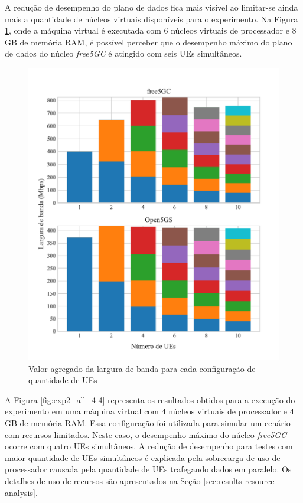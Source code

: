 A redução de desempenho do plano de dados fica mais visível ao limitar-se ainda mais a quantidade de núcleos virtuais disponíveis para o experimento.
Na Figura \ref{fig:exp2_all_6-8}, onde a máquina virtual é executada com 6 núcleos virtuais de processador e 8 GB de memória RAM, é possível perceber que o desempenho máximo do plano de dados do núcleo \textit{free5GC} é atingido com seis UEs simultâneos.

\begin{figure}[H]
    \centering
    \includegraphics[width=1\textwidth]{TG2/Chapters/DataAnalysis/Figures/EXP2-ALL-6C-8GB.pdf}
    \caption{Valor agregado da largura de banda para cada configuração de quantidade de UEs}
    \label{fig:exp2_all_6-8}
\end{figure}

A Figura \ref{fig:exp2_all_4-4} representa os resultados obtidos para a execução do experimento em uma máquina virtual com 4 núcleos virtuais de processador e 4 GB de memória RAM.
Essa configuração foi utilizada para simular um cenário com recursos limitados.
Neste caso, o desempenho máximo do núcleo \textit{free5GC} ocorre com quatro UEs simultâneos. 
A redução de desempenho para testes com maior quantidade de UEs simultâneos é explicada pela sobrecarga de uso de processador causada pela quantidade de UEs trafegando dados em paralelo.
Os detalhes de uso de recursos são apresentados na Seção \ref{sec:results-resource-analysis}.

